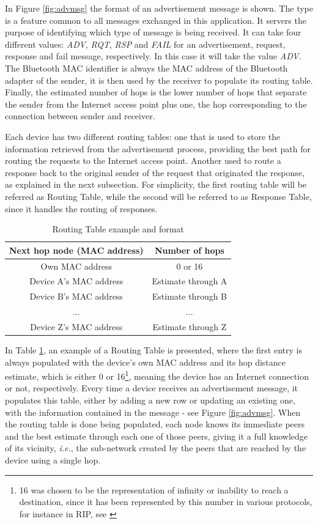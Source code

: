 In Figure \ref{fig:advmsg} the format of an advertisement message is shown. The type is a feature common to all messages exchanged in this application. It servers the purpose of identifying which type of message is being received. It can take four different values: \textit{ADV}, \textit{RQT}, \textit{RSP} and \textit{FAIL} for an advertisement, request, response and fail message, respectively. In this case it will take the value \textit{ADV}. The Bluetooth \gls{MAC} identifier is always the \gls{MAC} address of the Bluetooth adapter of the sender, it is then used by the receiver to populate its routing table. Finally, the estimated number of hops is the lower number of hops that separate the sender from the Internet access point plus one, the hop corresponding to the connection between sender and receiver.

Each device has two different routing tables: one that is used to store the information retrieved from the advertisement process, providing the best path for routing the requests to the Internet access point. Another used to route a response back to the original sender of the request that originated the response, as explained in the next subsection. For simplicity, the first routing table will be referred as Routing Table, while the second will be referred to as Response Table, since it handles the routing of responses. 

\begin{table}[ht]
\centering
\bgroup
\def\arraystretch{2.5}
\begin{tabular}{|c|c|}
\hline
\textbf{Next hop node (MAC address)} & \textbf{Number of hops} \\ \hline
Own MAC address & 0 or 16 \\ \hline
Device A's MAC address & Estimate through A \\ \hline
Device B's MAC address & Estimate through B \\ \hline
... & ... \\ \hline
Device Z's MAC address & Estimate through Z \\ \hline
\end{tabular}
\egroup
\caption{Routing Table example and format}
\label{tab:routTables}
\end{table}

In Table \ref{tab:routTables}, an example of a Routing Table is presented, where the first entry is always populated with the device's own \gls{MAC} address and its hop distance estimate, which is either 0 or 16\footnote{16 was chosen to be the representation of infinity or inability to reach a destination, since it has been represented by this number in various protocols, for instance in \gls{RIP}, see \cite{ripprotocol}}, meaning the device has an Internet connection or not, respectively. Every time a device receives an advertisement message, it populates this table, either by adding a new row or updating an existing one, with the information contained in the message - see Figure \ref{fig:advmsg}. When the routing table is done being populated, each node knows its immediate peers and the best estimate through each one of those peers, giving it a full knowledge of its vicinity, \textit{i.e.}, the sub-network created by the peers that are reached by the device using a single hop.

